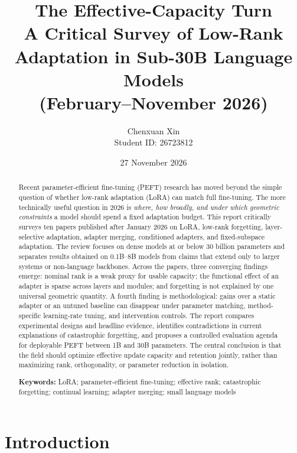 \documentclass[11pt]{article}
\title{\vspace{-18mm}\textbf{The Effective-Capacity Turn}\\[3pt]
\Large A Critical Survey of Low-Rank Adaptation in Sub-30B Language Models\\(February--November 2026)}
\author{Chenxuan Xin\\Student ID: 26723812}
\date{27 November 2026}
\begin{document}
\maketitle

\begin{abstract}
Recent parameter-efficient fine-tuning (PEFT) research has moved beyond the simple question of whether low-rank adaptation (LoRA) can match full fine-tuning. The more technically useful question in 2026 is \emph{where, how broadly, and under which geometric constraints} a model should spend a fixed adaptation budget. This report critically surveys ten papers published after January 2026 on LoRA, low-rank forgetting, layer-selective adaptation, adapter merging, conditioned adapters, and fixed-subspace adaptation. The review focuses on dense models at or below 30 billion parameters and separates results obtained on 0.1B--8B models from claims that extend only to larger systems or non-language backbones. Across the papers, three converging findings emerge: nominal rank is a weak proxy for usable capacity; the functional effect of an adapter is sparse across layers and modules; and forgetting is not explained by one universal geometric quantity. A fourth finding is methodological: gains over a static adapter or an untuned baseline can disappear under parameter matching, method-specific learning-rate tuning, and intervention controls. The report compares experimental designs and headline evidence, identifies contradictions in current explanations of catastrophic forgetting, and proposes a controlled evaluation agenda for deployable PEFT between 1B and 30B parameters. The central conclusion is that the field should optimize effective update capacity and retention jointly, rather than maximizing rank, orthogonality, or parameter reduction in isolation.

\vspace{3pt}
\noindent\textbf{Keywords:} LoRA; parameter-efficient fine-tuning; effective rank; catastrophic forgetting; continual learning; adapter merging; small language models
\end{abstract}

\section{Introduction}
\end{document}
